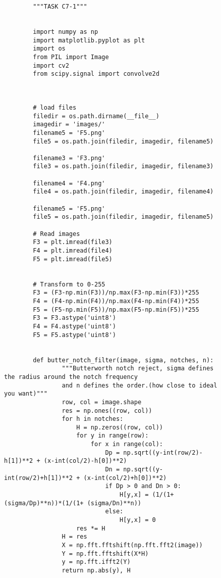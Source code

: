 {\begin{figure}[hbt!]
    \begin{lstlisting}
        """TASK C7-1"""


        import numpy as np 
        import matplotlib.pyplot as plt
        import os
        from PIL import Image
        import cv2
        from scipy.signal import convolve2d
        
        
        
        # load files
        filedir = os.path.dirname(__file__)
        imagedir = 'images/'
        filename5 = 'F5.png'
        file5 = os.path.join(filedir, imagedir, filename5)
        
        filename3 = 'F3.png'
        file3 = os.path.join(filedir, imagedir, filename3)
        
        filename4 = 'F4.png'
        file4 = os.path.join(filedir, imagedir, filename4)
        
        filename5 = 'F5.png'
        file5 = os.path.join(filedir, imagedir, filename5)
        
        # Read images
        F3 = plt.imread(file3)
        F4 = plt.imread(file4)
        F5 = plt.imread(file5)
        
        
        # Transform to 0-255
        F3 = (F3-np.min(F3))/np.max(F3-np.min(F3))*255
        F4 = (F4-np.min(F4))/np.max(F4-np.min(F4))*255
        F5 = (F5-np.min(F5))/np.max(F5-np.min(F5))*255
        F3 = F3.astype('uint8')
        F4 = F4.astype('uint8')
        F5 = F5.astype('uint8')
        
        
        def butter_notch_filter(image, sigma, notches, n):
                """Butterworth notch reject, sigma defines the radius around the notch frequency
                and n defines the order.(how close to ideal you want)"""
                row, col = image.shape
                res = np.ones((row, col))
                for h in notches:
                    H = np.zeros((row, col))
                    for y in range(row):
                        for x in range(col):
                            Dp = np.sqrt((y-int(row/2)-h[1])**2 + (x-int(col/2)-h[0])**2)
                            Dn = np.sqrt((y-int(row/2)+h[1])**2 + (x-int(col/2)+h[0])**2)
                            if Dp > 0 and Dn > 0:
                                H[y,x] = (1/(1+ (sigma/Dp)**n))*(1/(1+ (sigma/Dn)**n))
                            else:
                                H[y,x] = 0
                    res *= H
                H = res
                X = np.fft.fftshift(np.fft.fft2(image))
                Y = np.fft.fftshift(X*H)
                y = np.fft.ifft2(Y)
                return np.abs(y), H
        

\end{lstlisting}
\end{figure}}
